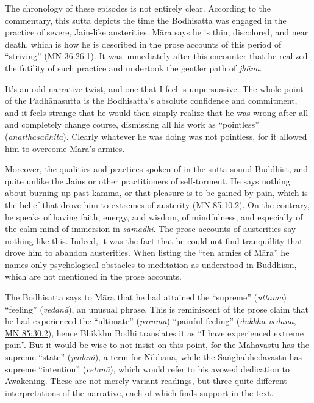 \documentclass[12pt,openany]{book}%
\begin{document}
The chronology of these episodes is not entirely clear. According to the commentary, this sutta depicts the time the Bodhisatta was engaged in the practice of severe, Jain-like austerities. \textsanskrit{Māra} says he is thin, discolored, and near death, which is how he is described in the prose accounts of this period of “striving” (\href{https://suttacentral.net/mn36/en/sujato\#26.1}{MN 36:26.1}). It was immediately after this encounter that he realized the futility of such practice and undertook the gentler path of \textit{\textsanskrit{jhāna}}.

It’s an odd narrative twist, and one that I feel is unpersuasive. The whole point of the \textsanskrit{Padhānasutta} is the Bodhisatta’s absolute confidence and commitment, and it feels strange that he would then simply realize that he was wrong after all and completely change course, dismissing all his work as “pointless” (\textit{\textsanskrit{anatthasañhita}}). Clearly whatever he was doing was not pointless, for it allowed him to overcome \textsanskrit{Māra}’s armies.

Moreover, the qualities and practices spoken of in the sutta sound Buddhist, and quite unlike the Jains or other practitioners of self-torment. He says nothing about burning up past kamma, or that pleasure is to be gained by pain, which is the belief that drove him to extremes of austerity (\href{https://suttacentral.net/mn85/en/sujato\#10.2}{MN 85:10.2}). On the contrary, he speaks of having faith, energy, and wisdom, of mindfulness, and especially of the calm mind of immersion in \textit{\textsanskrit{samādhi}}. The prose accounts of austerities say nothing like this. Indeed, it was the fact that he could not find tranquillity that drove him to abandon austerities. When listing the “ten armies of \textsanskrit{Māra}” he names only psychological obstacles to meditation as understood in Buddhism, which are not mentioned in the prose accounts.

The Bodhisatta says to \textsanskrit{Māra} that he had attained the “supreme” (\textit{uttama}) “feeling” (\textit{\textsanskrit{vedanā}}), an unusual phrase. This is reminiscent of the prose claim that he had experienced the “ultimate” (\textit{parama}) “painful feeling” (\textit{dukkha \textsanskrit{vedanā}}, \href{https://suttacentral.net/mn85/en/sujato\#30.2}{MN 85:30.2}), hence Bhikkhu Bodhi translates it as “I have experienced extreme pain”. But it would be wise to not insist on this point, for the \textsanskrit{Mahāvastu} has the supreme “state” (\textit{\textsanskrit{padaṁ}}), a term for \textsanskrit{Nibbāna}, while the \textsanskrit{Saṅghabhedavastu} has supreme “intention” (\textit{\textsanskrit{cetanā}}), which would refer to his avowed dedication to Awakening. These are not merely variant readings, but three quite different interpretations of the narrative, each of which finds support in the text.
\end{document}
